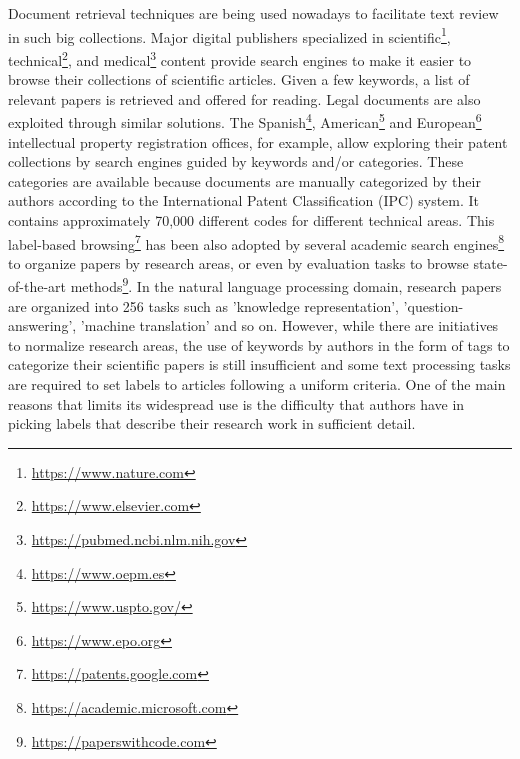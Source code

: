 Document retrieval techniques are being used nowadays to facilitate text review in such big collections. Major digital publishers specialized in scientific\footnote{\url{https://www.nature.com}}, technical\footnote{\url{https://www.elsevier.com}}, and medical\footnote{\url{https://pubmed.ncbi.nlm.nih.gov}} content provide search engines to make it easier to browse their collections of scientific articles. Given a few keywords, a list of relevant papers is retrieved and offered for reading. Legal documents are also exploited through similar solutions. The Spanish\footnote{\url{https://www.oepm.es}}, American\footnote{\url{https://www.uspto.gov/}} and European\footnote{\url{https://www.epo.org}} intellectual property registration offices, for example, allow exploring their patent collections by search engines guided by keywords and/or categories. These categories are available because documents are manually categorized by their authors according to the International Patent Classification (IPC) system. It contains approximately 70,000 different codes for different technical areas. This label-based browsing\footnote{\url{https://patents.google.com}} has been also adopted by several academic search engines\footnote{\url{https://academic.microsoft.com}} to organize papers by research areas, or even by evaluation tasks to browse state-of-the-art methods\footnote{\url{https://paperswithcode.com}}. In the natural language processing domain, research papers are organized into 256 tasks such as 'knowledge representation', 'question-answering', 'machine translation' and so on. However, while there are initiatives to normalize research areas, the use of keywords by authors in the form of tags to categorize their scientific papers is still insufficient and some text processing tasks are required to set labels to articles following a uniform criteria. One of the main reasons that limits its widespread use is the difficulty that authors have in picking labels that describe their research work in sufficient detail.

